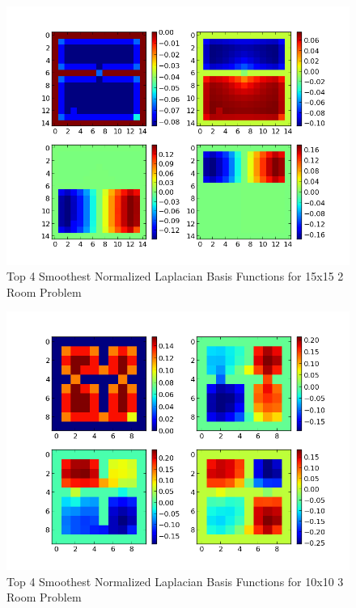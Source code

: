 \documentclass[12pt, letterpaper, final]{report}
\begin{document}
\FloatBarrier
\begin{figure}[h!]
\centering
\includegraphics[scale=.5]{images/paper_example_big_laplacian_graph.png}
\caption{Top 4 Smoothest Normalized Laplacian Basis Functions for
  15x15 2 Room Problem}
\label{laplacianBasis1}
\end{figure}
\FloatBarrier

\FloatBarrier
\begin{figure}[h!]
\centering
\includegraphics[scale=.5]{images/paper_example_multiroom_laplacian_graph.png}
\caption{Top 4 Smoothest Normalized Laplacian Basis Functions for
  10x10 3 Room Problem}
\label{laplacianBasis2}
\end{figure}
\FloatBarrier
\end{document}
